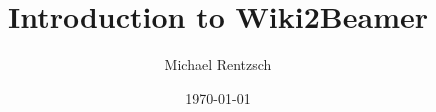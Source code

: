 \documentclass{beamer}
\title{Introduction to Wiki2Beamer}
\author{Michael Rentzsch}
\date{\today}
\begin{document}
\frame{\titlepage}


\end{document}
